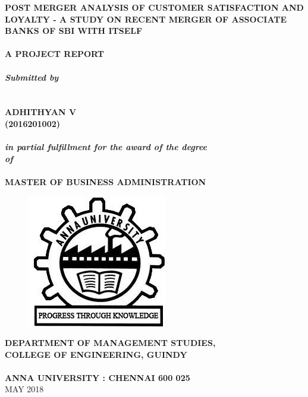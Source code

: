 \documentclass[a4paper, 12pt]{extarticle}
\newcommand\tab[1][1cm]{\hspace*{#1}}
\begin{document}
{
\selectfont
\begin{center}	
\textbf{\fontsize{18}{2} \selectfont POST MERGER ANALYSIS OF CUSTOMER SATISFACTION AND LOYALTY - A STUDY ON RECENT MERGER OF ASSOCIATE BANKS OF SBI WITH ITSELF}\\
\tab \\
\textbf{\fontsize{14}{2} \selectfont A PROJECT REPORT}\\
\tab \\
\textbf{\fontsize{14}{2} \selectfont \emph{Submitted by}}\\
\tab \\
\tab \\
{\fontsize{16}{2} \selectfont
\textbf{ADHITHYAN V}}\\
{\fontsize{16}{2} \selectfont \textbf{(2016201002)}}\\
\tab \\
\textbf{\emph{\fontsize{14}{2} \selectfont in partial fulfillment for the award of the degree\\ of}}\\
\tab \\
\textbf{\fontsize{16}{2} \selectfont MASTER OF BUSINESS ADMINISTRATION}\\
\begin{figure}[H]
\centering
\includegraphics[scale=0.5]{anna_univ_logo.jpg}
\end{figure}
\textbf{\fontsize{14}{2} \selectfont DEPARTMENT OF MANAGEMENT STUDIES, \\COLLEGE OF ENGINEERING, GUINDY}\\
\tab \\
\textbf{\fontsize{16}{2} \selectfont ANNA UNIVERSITY : CHENNAI 600 025}\\
{\fontsize{14}{2} \selectfont MAY 2018}\\
\end{center}
	
}
\end{document}

